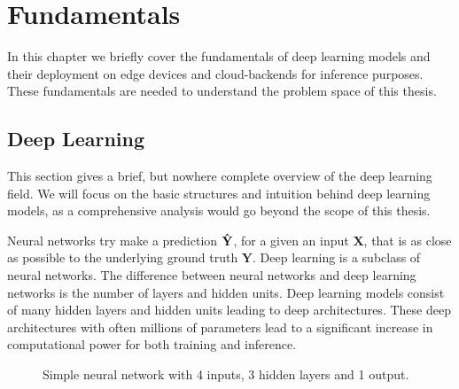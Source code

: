 \chapter{Fundamentals}
\label{chap:fundamentels}
In this chapter we briefly cover the fundamentals of deep learning models and their deployment on edge devices and cloud-backends for inference purposes.
These fundamentals are needed to understand the problem space of this thesis.



\section{Deep Learning}
This section gives a brief, but nowhere complete overview of the deep learning field. We will focus on the basic structures and intuition behind deep learning models, as a comprehensive analysis would go beyond the scope of this thesis.

Neural networks try make a prediction $\mathbf{\Hat{Y}}$, for a  given an input $\mathbf{X}$, that is as close as possible to the underlying ground truth $\mathbf{Y}$. 
Deep learning is a subclass of neural networks.
The difference between neural networks and deep learning networks is the number of layers and hidden units. Deep learning models consist of many hidden layers and hidden units leading to deep architectures.
These deep architectures with often millions of parameters lead to a significant increase in computational power for both training and inference.
\begin{figure}[!htb]
    \centering
    \resizebox{.8\linewidth}{!}{}
    \caption{Simple neural network with 4 inputs, 3 hidden layers and 1 output.}
    \label{fig:simpleNN}
\end{figure}

